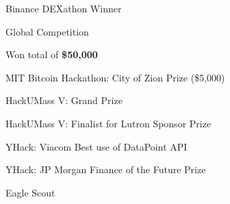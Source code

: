 
\begin{tightemize}
\item Binance DEXathon Winner
  \begin{tightemize}
  \item Global Competition
  \item Won total of \textbf{\$50,000}
  \end{tightemize}
\item MIT Bitcoin Hackathon: City of Zion Prize (\$5,000)
\item HackUMass V: Grand Prize
\item HackUMass V: Finalist for Lutron Sponsor Prize
\item YHack: Viacom Best use of DataPoint API
\item YHack: JP Morgan Finance of the Future Prize
\item Eagle Scout
\end{tightemize}